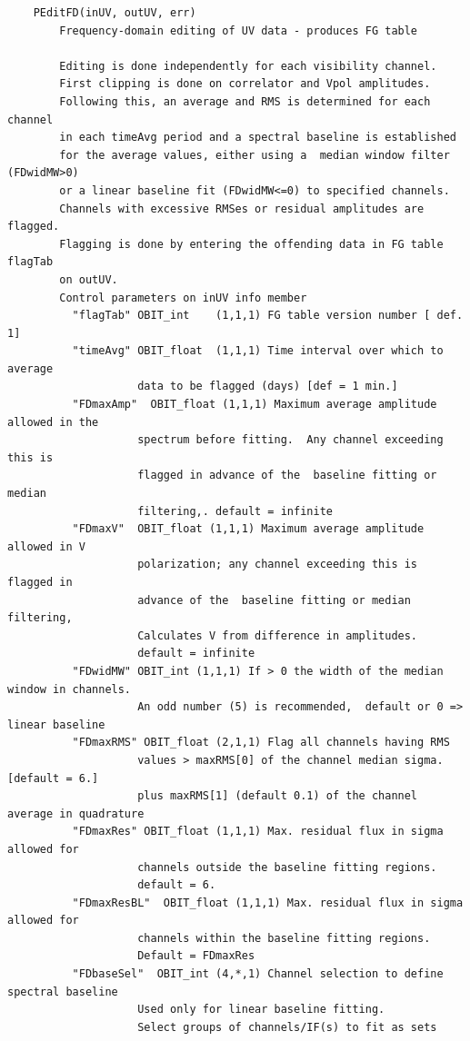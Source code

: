 \documentclass[11pt]{report}
\begin{document}
\begin{verbatim}
    PEditFD(inUV, outUV, err)
        Frequency-domain editing of UV data - produces FG table
        
        Editing is done independently for each visibility channel.  
        First clipping is done on correlator and Vpol amplitudes.  
        Following this, an average and RMS is determined for each channel 
        in each timeAvg period and a spectral baseline is established
        for the average values, either using a  median window filter (FDwidMW>0) 
        or a linear baseline fit (FDwidMW<=0) to specified channels.  
        Channels with excessive RMSes or residual amplitudes are flagged.
        Flagging is done by entering the offending data in FG table flagTab
        on outUV.
        Control parameters on inUV info member
          "flagTab" OBIT_int    (1,1,1) FG table version number [ def. 1]
          "timeAvg" OBIT_float  (1,1,1) Time interval over which to average 
                    data to be flagged (days) [def = 1 min.]
          "FDmaxAmp"  OBIT_float (1,1,1) Maximum average amplitude allowed in the
                    spectrum before fitting.  Any channel exceeding this is
                    flagged in advance of the  baseline fitting or median
                    filtering,. default = infinite 
          "FDmaxV"  OBIT_float (1,1,1) Maximum average amplitude allowed in V
                    polarization; any channel exceeding this is flagged in
                    advance of the  baseline fitting or median filtering, 
                    Calculates V from difference in amplitudes.   
                    default = infinite 
          "FDwidMW" OBIT_int (1,1,1) If > 0 the width of the median window in channels. 
                    An odd number (5) is recommended,  default or 0 => linear baseline
          "FDmaxRMS" OBIT_float (2,1,1) Flag all channels having RMS 
                    values > maxRMS[0] of the channel median sigma.[default = 6.]
                    plus maxRMS[1] (default 0.1) of the channel average in quadrature
          "FDmaxRes" OBIT_float (1,1,1) Max. residual flux in sigma allowed for 
                    channels outside the baseline fitting regions.  
                    default = 6.
          "FDmaxResBL"  OBIT_float (1,1,1) Max. residual flux in sigma allowed for 
                    channels within the baseline fitting regions. 
                    Default = FDmaxRes
          "FDbaseSel"  OBIT_int (4,*,1) Channel selection to define spectral baseline 
                    Used only for linear baseline fitting.
                    Select groups of channels/IF(s) to fit as sets 

\end{verbatim}
\end{document}

